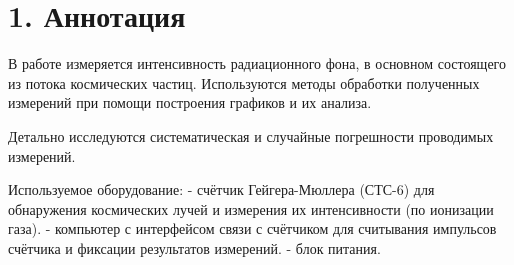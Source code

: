 \newpage


\section* {1. Аннотация}


В работе измеряется интенсивность радиационного фона, в основном состоящего из потока космических частиц. Используются методы обработки полученных измерений при помощи построения графиков и их анализа.


Детально исследуются систематическая и случайные погрешности проводимых измерений.


Используемое оборудование: 
-  счётчик Гейгера-Мюллера (СТС-6) для обнаружения космических лучей и измерения их интенсивности (по ионизации газа).
-  компьютер с интерфейсом связи с счётчиком для считывания импульсов счётчика и фиксации результатов измерений. 
-  блок питания.


